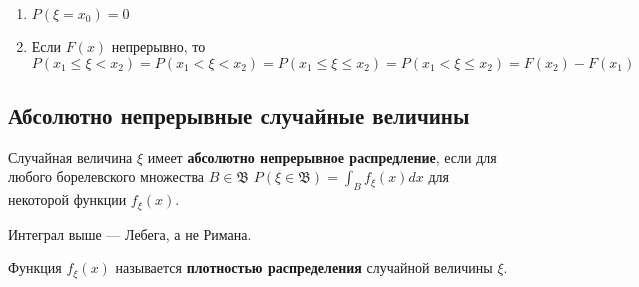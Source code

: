 \begin{prop}
\begin{enumerate}
\begin{proof}
                  \begin{align*}
                      P(C_n) + P(\xi \geq x_0)                       & = P(\xi = x_0)                           \\
                      P\left(x_0 \leq \xi < x_0 + \frac{1}{n}\right) & \xrightarrow{n \to +\infty} P(\xi = x_0) \\
                      F\left(x_0 + \frac{1}{n}\right) - F(x_0)       & \xrightarrow{n \to +\infty} P(\xi = x_0) \\
                      F(x_0 + 0) - F(x_0) = P(\xi = x_0)
                  \end{align*}
              \end{proof}

        \item \(P(\xi = x_0) = 0\)
        \item Если \(F(x)\) непрерывно, то \(P(x_1 \leq \xi < x_2) = P(x_1 < \xi < x_2) = P(x_1 \leq \xi \leq x_2) = P(x_1 < \xi \leq x_2) = F(x_2) - F(x_1)\)
    \end{enumerate}
\end{prop}

\subsection{Абсолютно непрерывные случайные величины}

\begin{definition}
    Случайная величина \(\xi\) имеет \textbf{абсолютно непрерывное распредление}, если для любого борелевского множества \(B \in \mathfrak{B}\) \(P(\xi \in \mathfrak{B}) = \int_B f_\xi(x) dx\) для некоторой функции \(f_\xi(x)\).
\end{definition}

\begin{remark}
    Интеграл выше --- Лебега, а не Римана.
\end{remark}

\begin{definition}
    Функция \(f_\xi(x)\) называется \textbf{плотностью распределения} случайной величины \(\xi\).
\end{definition}


